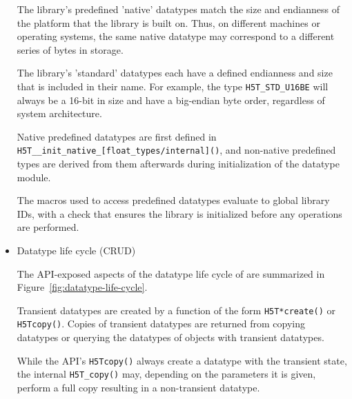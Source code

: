 \begin{itemize}
The library's predefined 'native' datatypes match the size and endianness of the platform that the library is built on. Thus, on different machines or operating systems, the same native datatype may correspond to a different series of bytes in storage. 

The library's 'standard' datatypes each have a defined endianness and size that is included in their name. For example, the type \texttt{H5T\_STD\_U16BE} will always be a 16-bit in size and have a big-endian byte order, regardless of system architecture. 

Native predefined datatypes are first defined in \texttt{H5T\_\_init\_native\_[float\_types/internal]()}, and non-native predefined types are derived from them afterwards during initialization of the datatype module.

The macros used to access predefined datatypes evaluate to global library IDs, with a check that ensures the library is initialized before any operations are performed.

    
        
    \item Datatype life cycle (CRUD)

The API-exposed aspects of the datatype life cycle of are summarized in Figure~\ref{fig:datatype-life-cycle}.

Transient datatypes are created by a function of the form \texttt{H5T*create()} or \texttt{H5Tcopy()}. Copies of transient datatypes are returned from copying datatypes or querying the datatypes of objects with transient datatypes.

While the API's \texttt{H5Tcopy()} always create a datatype with the transient state, the internal \texttt{H5T\_copy()} may, depending on the parameters it is given, perform a full copy resulting in a non-transient datatype.


\end{itemize}
